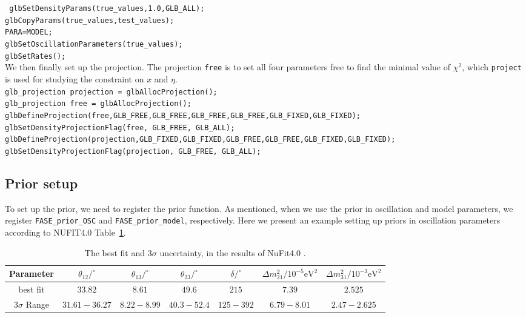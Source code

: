 \documentclass[a4paper,11pt]{article}
\begin{document}
\texttt{    glbSetDensityParams(true\_values,1.0,GLB\_ALL);}\\
\texttt{glbCopyParams(true\_values,test\_values);}\\
\texttt{PARA=MODEL;\\
    glbSetOscillationParameters(true\_values);\\
    glbSetRates();}\vspace{0.2cm}\\
We then finally set up the projection. The projection \texttt{free} is to set all four parameters free to find the minimal value of $\chi^2$, which \texttt{project} is used for studying the constraint on $x$ and $\eta$.\vspace{0.2cm}\\  
\texttt{glb\_projection projection = glbAllocProjection();\\
    glb\_projection free = glbAllocProjection();  \\
     glbDefineProjection(free,GLB\_FREE,GLB\_FREE,GLB\_FREE,GLB\_FREE,GLB\_FIXED,GLB\_FIXED);\\
    glbSetDensityProjectionFlag(free, GLB\_FREE, GLB\_ALL);\\
glbDefineProjection(projection,GLB\_FIXED,GLB\_FIXED,GLB\_FREE,GLB\_FREE,GLB\_FIXED,GLB\_FIXED);\\    
glbSetDensityProjectionFlag(projection, GLB\_FREE, GLB\_ALL);\\
    }
    
\subsection{Prior setup} 

To set up the prior, we need to register the prior function. As mentioned, when we use the prior in oscillation and model parameters, we register \texttt{FASE\_prior\_OSC} and \texttt{FASE\_prior\_model}, respectively. Here we present an example setting up priors in oscillation parameters according to NUFIT4.0 Table~\ref{tab:nufit4.0}.

\begin{table}[!h]
\caption{The best fit and $3\sigma$ uncertainty, in the results of NuFit4.0 \cite{Esteban:2018azc}.}
\begin{tabular}{|c|c|c|c|c|c|c|}
\hline
Parameter & $\theta_{12}/^\circ$ & $\theta_{13}/^\circ$ & $\theta_{23}/^\circ$ & $\delta/^\circ$  & $\Delta m_{21}^2/10^{-5}\text{eV}^2$ & $\Delta m_{31}^2/10^{-3}\text{eV}^2$\\ \hline\hline
best fit & $33.82$ & $8.61$ & $49.6$ & $215$ & $7.39$ & $2.525$ \\\hline
$3\sigma$ Range & $31.61-36.27$ & $8.22-8.99$ & $40.3-52.4$ & $125-392$ & $6.79-8.01$ & $2.47-2.625$ \\\hline
\end{tabular}
\label{tab:nufit4.0}
\end{table}
\end{document}
